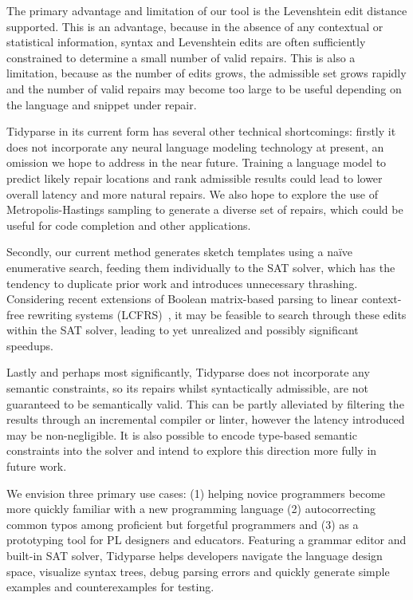 \documentclass[sigplan,review,anonymous,acmsmall]{acmart}\settopmatter{printfolios=false,printccs=false,printacmref=false}
\begin{document}
The primary advantage and limitation of our tool is the Levenshtein edit distance supported. This is an advantage, because in the absence of any contextual or statistical information, syntax and Levenshtein edits are often sufficiently constrained to determine a small number of valid repairs. This is also a limitation, because as the number of edits grows, the admissible set grows rapidly and the number of valid repairs may become too large to be useful depending on the language and snippet under repair.

Tidyparse in its current form has several other technical shortcomings: firstly it does not incorporate any neural language modeling technology at present, an omission we hope to address in the near future. Training a language model to predict likely repair locations and rank admissible results could lead to lower overall latency and more natural repairs. We also hope to explore the use of Metropolis-Hastings sampling to generate a diverse set of repairs, which could be useful for code completion and other applications.

Secondly, our current method generates sketch templates using a na\"ive enumerative search, feeding them individually to the SAT solver, which has the tendency to duplicate prior work and introduces unnecessary thrashing. Considering recent extensions of Boolean matrix-based parsing to linear context-free rewriting systems (LCFRS)~\cite{cohen2016parsing}, it may be feasible to search through these edits within the SAT solver, leading to yet unrealized and possibly significant speedups.

Lastly and perhaps most significantly, Tidyparse does not incorporate any semantic constraints, so its repairs whilst syntactically admissible, are not guaranteed to be semantically valid. This can be partly alleviated by filtering the results through an incremental compiler or linter, however the latency introduced may be non-negligible. It is also possible to encode type-based semantic constraints into the solver and intend to explore this direction more fully in future work.


We envision three primary use cases: (1) helping novice programmers become more quickly familiar with a new programming language (2) autocorrecting common typos among proficient but forgetful programmers and (3) as a prototyping tool for PL designers and educators. Featuring a grammar editor and built-in SAT solver, Tidyparse helps developers navigate the language design space, visualize syntax trees, debug parsing errors and quickly generate simple examples and counterexamples for testing. %
\end{document}
